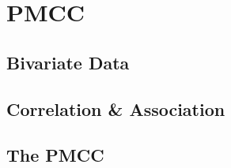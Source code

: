 \documentclass[../alevelmaths.tex]{subfiles}
\begin{document}
\chapter{PMCC}
\section{Bivariate Data}
\section{Correlation \& Association}
\section{The PMCC}
\end{document}
